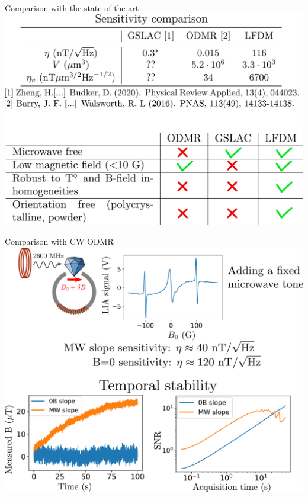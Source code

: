 \documentclass{beamer}
\begin{document}
\begin{frame}{Comparison with the state of the art}
\centering
\includegraphics[width=\textwidth,height=0.9\textheight,keepaspectratio]{Slide_comparison_litterature}
\end{frame}

\begin{frame}{Comparison with CW ODMR}
\centering
\includegraphics[width=\textwidth,height=0.9\textheight,keepaspectratio]{Slide_comparison_microwave}
\end{frame}
\end{document}
